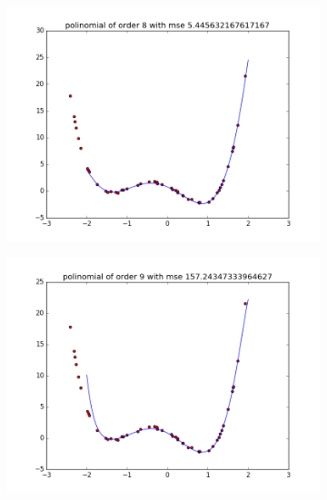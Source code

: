 \documentclass{article}
\begin{document}
\begin{figure}
\centering  
        \begin{subfigure}[b]{0.48\textwidth}
                \centering
                \includegraphics[width=\linewidth]{poli-order-8}
        \end{subfigure}\hfill
        \begin{subfigure}[b]{0.48\textwidth}
                \centering
                \includegraphics[width=\linewidth]{poli-order-9}
        \end{subfigure}
        \label{fig:6}
\end{figure}
\end{document}
